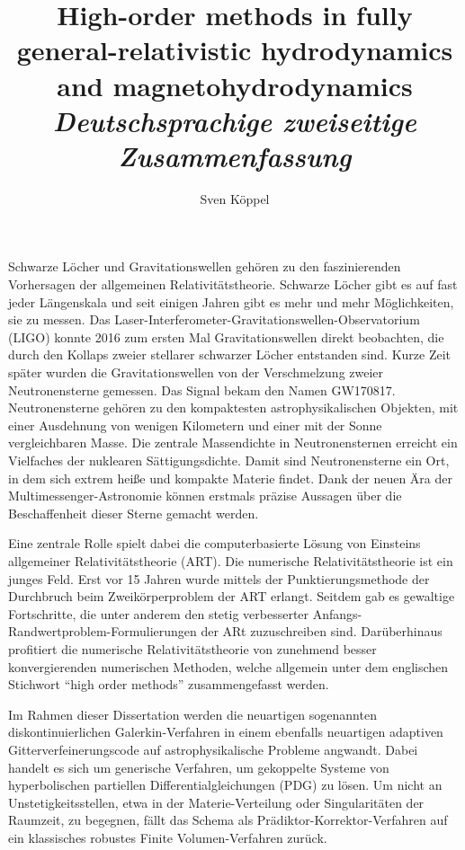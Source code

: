 \documentclass[a4paper,12pt]{article}
\title{
	High-order methods in fully general-relativistic hydrodynamics and magnetohydrodynamics
	\\[0.5em]\large {\it Deutschsprachige zweiseitige Zusammenfassung}
}
\author{Sven Köppel}
\date{} %
\begin{document}
\maketitle

Schwarze Löcher und Gravitationswellen gehören zu den faszinierenden Vorhersagen
der allgemeinen Relativitäts\-theorie. Schwarze Löcher gibt es auf fast jeder
Längenskala und seit einigen Jahren gibt es mehr und mehr Möglich\-keiten, sie
zu messen. Das Laser-Interferometer-Gravitationswellen-Observatorium (LIGO)
konnte 2016 zum ersten Mal Gravitationswellen direkt beobachten, die durch den
Kollaps zweier stellarer schwarzer Löcher entstanden sind. Kurze Zeit später 
wurden
die Gravitationswellen von der Verschmelzung zweier Neutronensterne gemessen.
Das Signal bekam den Namen GW170817.
Neutronensterne gehören zu den kompaktesten astrophysikalischen Objekten,
mit einer Ausdehnung von wenigen Kilometern und einer mit der Sonne vergleichbaren
Masse. Die zentrale Massendichte in Neutronensternen erreicht ein Vielfaches
der nuklearen Sättigungsdichte. Damit sind Neutronensterne ein Ort, in dem sich
extrem heiße und kompakte Materie findet. Dank der
neuen Ära der Multimessenger-Astronomie können erstmals präzise Aussagen über 
die Beschaffenheit dieser Sterne gemacht werden.

Eine zentrale Rolle spielt dabei die computerbasierte Lösung von Einsteins
allgemeiner Relativitätstheorie (ART). Die numerische Relativitätstheorie ist ein
junges Feld. Erst vor 15 Jahren wurde mittels der Punktierungsmethode
der Durchbruch beim Zweikörperpro\-blem der ART erlangt. Seitdem gab es 
gewaltige
Fortschritte, die unter anderem den stetig verbesserter 
Anfangs-Randwertproblem-Formulierungen der ARt zuzuschreiben sind.
Darüber\-hinaus profitiert die numerische Relativitäts\-theorie von zunehmend
besser konvergierenden numerischen Methoden, welche allgemein
unter dem englischen Stichwort ``high order methods'' zusammengefasst werden.

Im Rahmen dieser Dissertation werden die neuartigen sogenannten 
diskontinuierlichen Galerkin-Verfahren in einem ebenfalls neuartigen adaptiven
Gitterverfeinerungscode auf astrophysikalische Probleme angwandt. Dabei handelt 
es sich um generische Verfahren, um gekoppelte Systeme von hyperbolischen 
partiellen Differentialgleichungen (PDG) zu lösen. Um nicht an
Unstetigkeitsstellen, etwa
in der Materie-Verteilung oder Singularitäten der Raumzeit, zu begegnen,
fällt das Schema als Prädiktor-Korrektor-Verfahren auf ein klassisches
robustes Finite Volumen-Verfahren zurück.
\end{document}
